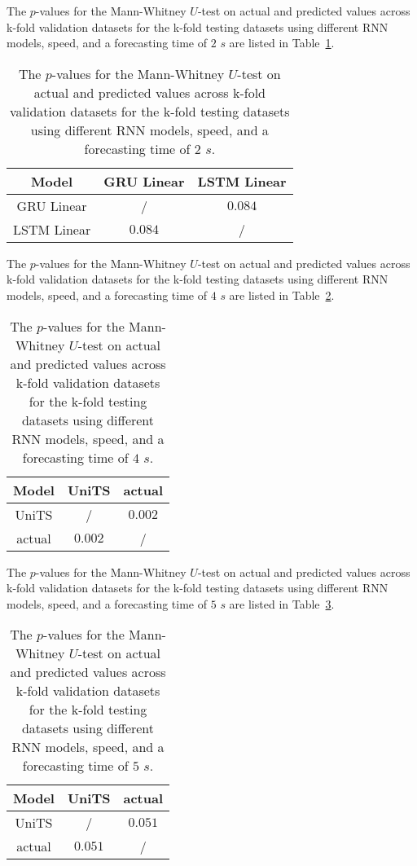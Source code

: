 The $p$-values for the Mann-Whitney $U$-test on actual and predicted values across k-fold validation datasets for the k-fold testing datasets using different RNN models, speed, and a forecasting time of $2$ $s$ are listed in Table~\ref{tab:speed:p:2}.

\begin{table}[!ht]
	\centering
	\begin{tabular}{|c|c|c|}
		\hline
		Model & GRU Linear & LSTM Linear \\ \hline
		GRU Linear & / & $\mathbf{0.084}$ \\ \hline
		LSTM Linear & $\mathbf{0.084}$ & / \\ \hline
	\end{tabular}
	\caption{The $p$-values for the Mann-Whitney $U$-test on actual and predicted values across k-fold validation datasets for the k-fold testing datasets using different RNN models, speed, and a forecasting time of $2$ $s$.}
	\label{tab:speed:p:2}
\end{table}

The $p$-values for the Mann-Whitney $U$-test on actual and predicted values across k-fold validation datasets for the k-fold testing datasets using different RNN models, speed, and a forecasting time of $4$ $s$ are listed in Table~\ref{tab:speed:p:4}.

\begin{table}[!ht]
	\centering
	\begin{tabular}{|c|c|c|}
		\hline
		Model & UniTS & actual \\ \hline
		UniTS & / & $\mathbf{0.002}$ \\ \hline
		actual & $\mathbf{0.002}$ & / \\ \hline
	\end{tabular}
	\caption{The $p$-values for the Mann-Whitney $U$-test on actual and predicted values across k-fold validation datasets for the k-fold testing datasets using different RNN models, speed, and a forecasting time of $4$ $s$.}
	\label{tab:speed:p:4}
\end{table}

The $p$-values for the Mann-Whitney $U$-test on actual and predicted values across k-fold validation datasets for the k-fold testing datasets using different RNN models, speed, and a forecasting time of $5$ $s$ are listed in Table~\ref{tab:speed:p:5}.

\begin{table}[!ht]
	\centering
	\begin{tabular}{|c|c|c|}
		\hline
		Model & UniTS & actual \\ \hline
		UniTS & / & $\mathbf{0.051}$ \\ \hline
		actual & $\mathbf{0.051}$ & / \\ \hline
	\end{tabular}
	\caption{The $p$-values for the Mann-Whitney $U$-test on actual and predicted values across k-fold validation datasets for the k-fold testing datasets using different RNN models, speed, and a forecasting time of $5$ $s$.}
	\label{tab:speed:p:5}
\end{table}

